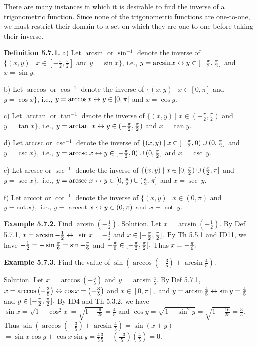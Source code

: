 There are many instances in which it is desirable to find the inverse of a trigonometric function. Since none of the trigonometric functions are one-to-one, we must restrict their domain to a set on which they are one-to-one before taking their inverse. \nl

\textbf{Definition 5.7.1.} \nl
a) 	Let $\arcsin$ or $\sin^{-1}$ denote the inverse of $\{(x,y) \mid x\in [-\frac{\pi}{2}, \frac{\pi}{2}]$ and $y = \sin x\}$,
i.e., $y = \arcsin x \leftrightarrow y \in [-\frac{\pi}{2}, \frac{\pi}{2}] $ and $x = \sin y.$ \nl

b) 	Let $\arccos$ or $\cos^{-1}$ denote the inverse of $\{(x,y) \mid x\in [0, \pi]$ and $y = \cos x\}$,
i.e., $y = \arccos x \leftrightarrow y \in [0, \pi] $ and $x = \cos y.$ \nl

c) 	Let $\arctan$ or $\tan^{-1}$ denote the inverse of $\{(x,y) \mid x\in (-\frac{\pi}{2}, \frac{\pi}{2})$ and $y = \tan x\}$,
i.e., $y = \arctan~x \leftrightarrow y \in (-\frac{\pi}{2}, \frac{\pi}{2}) $ and $x = \tan y.$ \nl

d) Let arccsc or $\csc^{-1}$ denote the inverse of $\{(x,y) \mid x\in  [-\frac{\pi}{2},0)\cup (0,\frac{\pi}{2}]$ and $y = \csc x\},$ i.e., $y = \text{arccsc~}x \leftrightarrow y\in [-\frac{\pi}{2},0)\cup (0,\frac{\pi}{2} ]$ and $x = \csc~y.$ \nl

e) Let arcsec or $\sec^{-1}$ denote the inverse of $\{(x,y) \mid x\in [0,\frac{\pi}{2})\cup (\frac{\pi}{2}, \pi]$ and $y =\sec x \},$ i.e., $y = \text{arcsec}~x \leftrightarrow  y \in [0,\frac{\pi}{2})\cup (\frac{\pi}{2}, \pi]$ and $x = \sec~y.$ \nl

f) Let arccot or $\cot^{-1}$ denote the inverse of $\{(x,y) \mid x \in (0,\pi)$ and $y = \text{cot} ~x \},$ i.e., $y = $ arccot $x \leftrightarrow y \in (0,\pi)$ and $x = \cot~y.$ \nl

\textbf{Example 5.7.2.} Find $\arcsin (-\frac{1}{2}).$\nl
Solution. Let $x = \arcsin(-\frac{1}{2}).$ By Def 5.7.1, $x = \arcsin -\frac{1}{2} \leftrightarrow$  $\sin x = -\frac{1}{2}$ and $x\in [-\frac{\pi}{2}, \frac{\pi}{2}].$   By Th 5.5.1 and ID11, we have $- \frac{1}{2} = -\sin\frac{\pi}{6}=
\sin-\frac{\pi}{6}$ and $-\frac{\pi}{6} \in [-\frac{\pi}{2}, \frac{\pi}{2}].$   Thus $x = -\frac{\pi}{6}.$\nl

\textbf{Example 5.7.3.}  Find the value of $\sin\left(\arccos (-\frac{3}{5}) + \arcsin \frac{4}{5}\right).$\nl

\newpage
Solution. Let $x = \arccos (-\frac{3}{5}) $ and $ y = \arcsin \frac{4}{5}.$  By Def 5.7.1, $x = \arccos \left(-\frac{3}{5}\right) \leftrightarrow
 \cos x = \left(-\frac{3}{5}\right)$ and $x \in  [0,\pi],$
 and $y = \arcsin \frac{4}{5} \leftrightarrow \sin y = \frac{4}{5}$ and $y\in  [-\frac{\pi}{2}, \frac{\pi}{2}].$\nl
 By ID4 and Th 5.3.2, we have $\sin x = \sqrt{1 - \cos^{2}x} = \sqrt{1 - \frac{9}{25}} = \frac{4}{5}$ and $\cos y =
\sqrt{1 - \sin^{2}y} = \sqrt{1 - \frac{16}{25}} = \frac{3}{5}.$ Thus $\sin\left(\arccos (-\frac{3}{5}) + \arcsin \frac{4}{5}\right) = \sin(x + y)$ $= \sin x \cos y + \cos x \sin y = \frac{4}{5}\frac{3}{5} + (\frac{-3}{5})(\frac{4}{5}) = 0.$\nl

